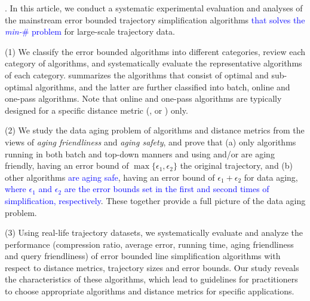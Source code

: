 {%



.
In this article, we conduct a systematic experimental evaluation and analyses of the mainstream error bounded trajectory simplification algorithms \textcolor{blue}{that solves the \emph{min-$\#$} problem} for large-scale trajectory data.

\stab (1) We classify the error bounded \lsa algorithms into different categories, review each category of algorithms, and systematically evaluate the representative algorithms of each category.
%
 summarizes the algorithms that consist of optimal and sub-optimal algorithms, and the latter are further classified into batch, online and one-pass algorithms.
Note that online and one-pass algorithms are typically designed for a specific distance metric  (\ped, \sed or \dad) only.

\stab (2) {We study the data aging problem of \lsa algorithms and distance metrics from the views of \emph{aging friendliness} and \emph{aging safety}, and prove that (a) only algorithms running in both batch and top-down manners and using \ped and/or \sed are aging friendly, having an error bound of $\max{\{\epsilon_1, \epsilon_2\}}$ \wrt the original trajectory, and (b) other algorithms \textcolor{blue}{are aging safe}, having an error bound of ${\epsilon_1+\epsilon_2}$ for data aging, \textcolor{blue}{where $\epsilon_1$ and $\epsilon_2$ are the error bounds set in the first and second times of simplification, respectively}.  These together provide a full picture of the data aging problem.}

\stab (3) Using real-life trajectory datasets, we systematically evaluate and analyze the performance (compression ratio, average error, running time, {aging friendliness and query friendliness}) of error bounded line simplification algorithms with respect to {distance metrics,} trajectory sizes and error bounds.
Our study reveals the characteristics of these algorithms, which lead to guidelines for practitioners to choose appropriate algorithms and distance metrics for specific applications.


}
